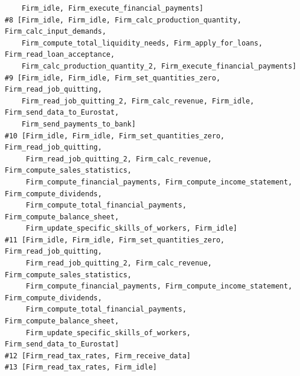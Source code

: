 {\begin{verbatim}
    Firm_idle, Firm_execute_financial_payments]
#8 [Firm_idle, Firm_idle, Firm_calc_production_quantity, Firm_calc_input_demands,
    Firm_compute_total_liquidity_needs, Firm_apply_for_loans, Firm_read_loan_acceptance,
    Firm_calc_production_quantity_2, Firm_execute_financial_payments]
#9 [Firm_idle, Firm_idle, Firm_set_quantities_zero, Firm_read_job_quitting,
    Firm_read_job_quitting_2, Firm_calc_revenue, Firm_idle, Firm_send_data_to_Eurostat,
    Firm_send_payments_to_bank]
#10 [Firm_idle, Firm_idle, Firm_set_quantities_zero, Firm_read_job_quitting,
     Firm_read_job_quitting_2, Firm_calc_revenue, Firm_compute_sales_statistics,
     Firm_compute_financial_payments, Firm_compute_income_statement, Firm_compute_dividends,
     Firm_compute_total_financial_payments, Firm_compute_balance_sheet,
     Firm_update_specific_skills_of_workers, Firm_idle]
#11 [Firm_idle, Firm_idle, Firm_set_quantities_zero, Firm_read_job_quitting,
     Firm_read_job_quitting_2, Firm_calc_revenue, Firm_compute_sales_statistics,
     Firm_compute_financial_payments, Firm_compute_income_statement, Firm_compute_dividends,
     Firm_compute_total_financial_payments, Firm_compute_balance_sheet, 
     Firm_update_specific_skills_of_workers, Firm_send_data_to_Eurostat]
#12 [Firm_read_tax_rates, Firm_receive_data]
#13 [Firm_read_tax_rates, Firm_idle]
\end{verbatim}
}
